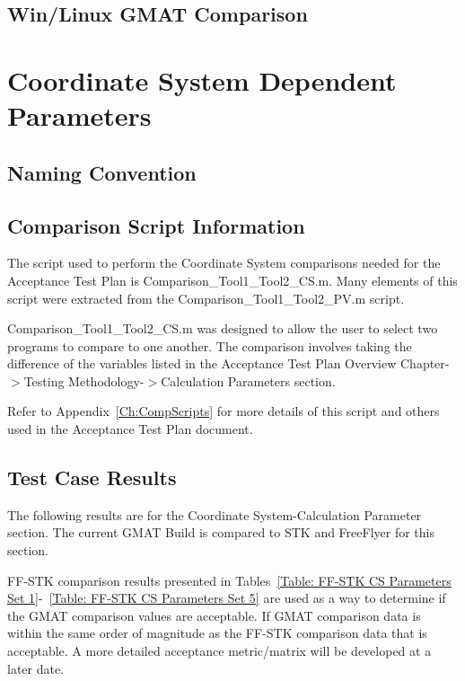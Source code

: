 \subsection{Win/Linux GMAT Comparison}






\section{Coordinate System Dependent Parameters}
\subsection{Naming Convention}
\label{nameConvCS}


\subsection{Comparison Script Information}
The script used to perform the Coordinate System comparisons needed
for the Acceptance Test Plan is Comparison\_Tool1\_Tool2\_CS.m. Many
elements of this script were extracted from the
Comparison\_Tool1\_Tool2\_PV.m script.

Comparison\_Tool1\_Tool2\_CS.m was designed to allow the user to
select two programs to compare to one another. The comparison
involves taking the difference of the variables listed in the
Acceptance Test Plan Overview Chapter-$>$Testing
Methodology-$>$Calculation Parameters section.

Refer to Appendix~\ref{Ch:CompScripts} for more details of this
script and others used in the Acceptance Test Plan document.

\subsection{Test Case Results}
The following results are for the Coordinate System-Calculation
Parameter section. The current GMAT Build is compared to
STK and FreeFlyer for this section.

 FF-STK comparison results presented in
Tables~\ref{Table: FF-STK CS Parameters Set 1}-~\ref{Table: FF-STK
CS Parameters Set 5} are used as a way to determine if the GMAT
comparison values are acceptable. If GMAT comparison data is within
the same order of magnitude as the
FF-STK comparison data that is
acceptable. A more detailed acceptance metric/matrix will be
developed at a later date.

